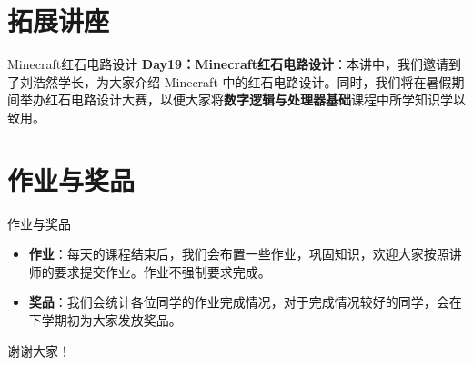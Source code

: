 \documentclass{beamer}
\begin{document}
    \section{拓展讲座}

    \begin{frame}{Minecraft红石电路设计}
        \textbf{Day19：Minecraft红石电路设计}：本讲中，我们邀请到了刘浩然学长，为大家介绍 Minecraft 中的红石电路设计。同时，我们将在暑假期间举办红石电路设计大赛，以便大家将\textbf{数字逻辑与处理器基础}课程中所学知识学以致用。
    \end{frame}

    \section{作业与奖品}

    \begin{frame}{作业与奖品}
        \begin{itemize}
            \item \textbf{作业}：每天的课程结束后，我们会布置一些作业，巩固知识，欢迎大家按照讲师的要求提交作业。作业不强制要求完成。
            \item \textbf{奖品}：我们会统计各位同学的作业完成情况，对于完成情况较好的同学，会在下学期初为大家发放奖品。
        \end{itemize}
    \end{frame}
	
	\begin{frame}{}
	    \centering \Huge{\heiti 谢谢大家！}
	\end{frame}
	
\end{document}
